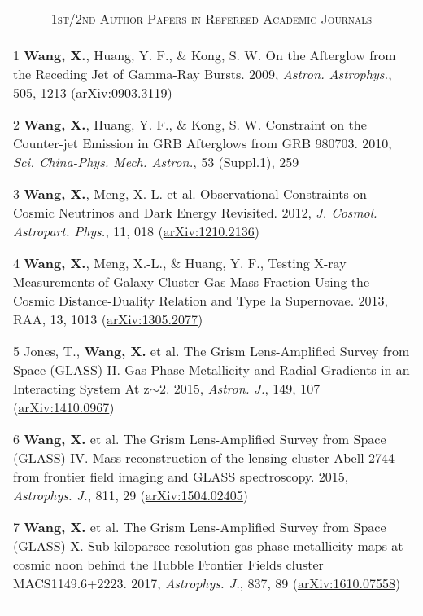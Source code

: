 \documentclass[letterpaper,10pt]{article}
\begin{document}
\begin{longtable}{p{6in}}
\multicolumn{1}{c}{\textsc{1st/2nd Author Papers in Refereed Academic Journals}}      \\
\vspace{-1em}

\begin{list}{}{\leftmargin=0.5em}
    \item[1]\hypertarget{09.wang.aa}{} \textbf{Wang, X.}, Huang, Y. F., \& Kong, S. W. On the Afterglow from the Receding Jet of Gamma-Ray Bursts. 2009, \textit{Astron. Astrophys.}, 505, 1213 (\href{http://arxiv.org/abs/0903.3119}{arXiv:0903.3119})
    \item[2]\hypertarget{10.wang.scichina}{} \textbf{Wang, X.}, Huang, Y. F., \& Kong, S. W. Constraint on the Counter-jet Emission in GRB Afterglows from GRB 980703. 2010, \textit{Sci. China-Phys. Mech. Astron.}, 53 (Suppl.1), 259
    \item[3]\hypertarget{12.wang.jcap}{} \textbf{Wang, X.}, Meng, X.-L. et al. Observational Constraints on Cosmic Neutrinos and Dark Energy Revisited. 2012, \textit{J. Cosmol. Astropart. Phys.}, 11, 018 (\href{http://arxiv.org/abs/1210.2136}{arXiv:1210.2136})
    \item[4]\hypertarget{13.wang.raa}{} \textbf{Wang, X.}, Meng, X.-L., \& Huang, Y. F., Testing X-ray Measurements of Galaxy Cluster Gas
  Mass Fraction Using the Cosmic Distance-Duality Relation and Type Ia Supernovae. 2013, RAA, 13, 1013 (\href{http://arxiv.org/abs/1305.2077}{arXiv:1305.2077})
    \item[5]\hypertarget{15.jones.aj}{} Jones, T., \textbf{Wang, X.} et al. The Grism Lens-Amplified Survey from Space (GLASS) II. Gas-Phase Metallicity and Radial Gradients in an Interacting System At z$\sim$2. 2015, \textit{Astron. J.}, 149, 107 (\href{http://arxiv.org/abs/1410.0967}{arXiv:1410.0967})
    \item[6]\hypertarget{15.wang.apj}{} \textbf{Wang, X.} et al. The Grism Lens-Amplified Survey from Space (GLASS) IV. Mass reconstruction of the lensing cluster Abell 2744 from frontier field imaging and GLASS spectroscopy. 2015, \textit{Astrophys. J.}, 811, 29 (\href{http://arxiv.org/abs/1504.02405}{arXiv:1504.02405})
    \item[7]\hypertarget{17.wang.apj}{} \textbf{Wang, X.} et al. The Grism Lens-Amplified Survey from Space (GLASS) X. Sub-kiloparsec resolution gas-phase metallicity maps at cosmic noon behind the Hubble Frontier Fields cluster MACS1149.6+2223. 2017, \textit{Astrophys. J.}, 837, 89 (\href{http://arxiv.org/abs/1610.07558}{arXiv:1610.07558})

\end{list}
\end{longtable}
\end{document}
